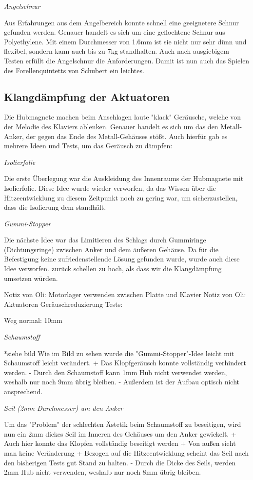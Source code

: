 \textit{Angelschnur}

Aus Erfahrungen aus dem Angelbereich konnte schnell eine geeignetere Schnur gefunden werden.
Genauer handelt es sich um eine geflochtene Schnur aus Polyethylene.
Mit einem Durchmesser von 1.6mm ist sie nicht nur sehr dünn und flexibel, sondern kann auch bis zu 7kg standhalten.
Auch nach ausgiebigem Testen erfüllt die Angelschnur die Anforderungen.
Damit ist nun auch das Spielen des Forellenquintetts von Schubert ein leichtes.

\subsection{Klangdämpfung der Aktuatoren}
Die Hubmagnete machen beim Anschlagen laute "klack" Geräusche, welche von der Melodie des Klaviers ablenken.
Genauer handelt es sich um das den Metall-Anker, der gegen das Ende des Metall-Gehäuses stößt.
Auch hierfür gab es mehrere Ideen und Tests, um das Geräusch zu dämpfen:

\textit{Isolierfolie}

Die erste Überlegung war die Auskleidung des Innenraums der Hubmagnete mit Isolierfolie.
Diese Idee wurde wieder verworfen, da das Wissen über die Hitzeentwicklung zu diesem Zeitpunkt noch zu gering war, um sicherzustellen, dass die Isolierung dem standhält.

\textit{Gummi-Stopper}

Die nächste Idee war das Limitieren des Schlags durch Gummiringe (Dichtungsringe) zwischen Anker und dem äußeren Gehäuse.
Da für die Befestigung keine zufriedenstellende Lösung gefunden wurde, wurde auch diese Idee verworfen.
zurück schellen zu hoch, als dass wir die Klangdämpfung umsetzen würden.

Notiz von Oli: Motorlager verwenden zwischen Platte und Klavier
Notiz von Oli:
Aktuatoren Geräuschreduzierung Tests:

Weg normal: 10mm

\textit{Schaumstoff}

*siehe bild
Wie im Bild zu sehen wurde die "Gummi-Stopper"-Idee leicht mit Schaumstoff leicht verändert.
+ Das Klopfgeräusch konnte vollständig verhindert werden.
- Durch den Schaumstoff kann 1mm Hub nicht verwendet werden, weshalb nur noch 9mm übrig bleiben.
- Außerdem ist der Aufbau optisch nicht ansprechend.


\textit{Seil (2mm Durchmesser) um den Anker}

Um das "Problem" der schlechten Ästetik beim Schaumstoff zu beseitigen, wird nun ein 2mm dickes Seil im Inneren des Gehäuses um den Anker gewickelt.
+ Auch hier konnte das Klopfen vollständig beseitigt werden
+ Von außen sieht man keine Veränderung
+ Bezogen auf die Hitzeentwicklung scheint das Seil nach den bisherigen Tests gut Stand zu halten.
- Durch die Dicke des Seils, werden 2mm Hub nicht verwenden, weshalb nur noch 8mm übrig bleiben.


